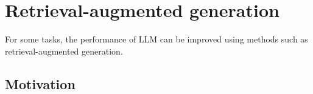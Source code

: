 %
%
%
%
%
%
%



\section{Retrieval-augmented generation}

For some tasks, the performance of LLM can be improved using methods such as retrieval-augmented generation.


\subsection{Motivation}

